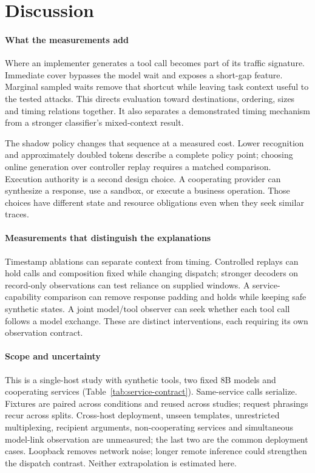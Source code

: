 \section{Discussion}\label{sec:discussion}
\paragraph{What the measurements add}
Where an implementer generates a tool call becomes part of its traffic signature. Immediate cover bypasses the model wait and exposes a short-gap feature. Marginal sampled waits remove that shortcut while leaving task context useful to the tested attacks. This directs evaluation toward destinations, ordering, sizes and timing relations together. It also separates a demonstrated timing mechanism from a stronger classifier's mixed-context result.

The shadow policy changes that sequence at a measured cost. Lower recognition and approximately doubled tokens describe a complete policy point; choosing online generation over controller replay requires a matched comparison. Execution authority is a second design choice. A cooperating provider can synthesize a response, use a sandbox, or execute a business operation. Those choices have different state and resource obligations even when they seek similar traces.

\paragraph{Measurements that distinguish the explanations}
Timestamp ablations can separate context from timing. Controlled replays can hold calls and composition fixed while changing dispatch; stronger decoders on record-only observations can test reliance on supplied windows. A service-capability comparison can remove response padding and holds while keeping safe synthetic states. A joint model/tool observer can seek whether each tool call follows a model exchange. These are distinct interventions, each requiring its own observation contract.

\paragraph{Scope and uncertainty}\label{sec:limits}
This is a single-host study with synthetic tools, two fixed 8B models and cooperating services (Table~\ref{tab:service-contract}). Same-service calls serialize. Fixtures are paired across conditions and reused across studies; request phrasings recur across splits. Cross-host deployment, unseen templates, unrestricted multiplexing, recipient arguments, non-cooperating services and simultaneous model-link observation are unmeasured; the last two are the common deployment cases. Loopback removes network noise; longer remote inference could strengthen the dispatch contrast. Neither extrapolation is estimated here.

